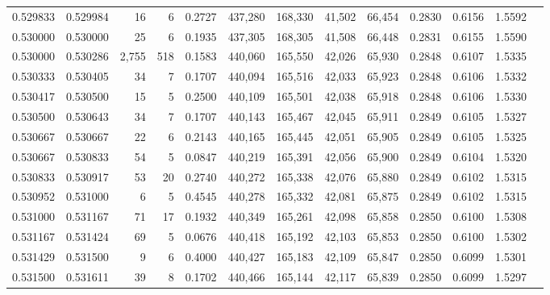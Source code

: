 \begin{tabular}{rrrrrrrrrrrrr}
0.529833 & 0.529984 &    16 &   6 &                                     0.2727 & 437,280 & 168,330 &  41,502 &  66,454 & 0.2830 & 0.6156 & 1.5592 \\
0.530000 & 0.530000 &    25 &   6 &                                     0.1935 & 437,305 & 168,305 &  41,508 &  66,448 & 0.2831 & 0.6155 & 1.5590 \\
0.530000 & 0.530286 & 2,755 & 518 &                                     0.1583 & 440,060 & 165,550 &  42,026 &  65,930 & 0.2848 & 0.6107 & 1.5335 \\
0.530333 & 0.530405 &    34 &   7 &                                     0.1707 & 440,094 & 165,516 &  42,033 &  65,923 & 0.2848 & 0.6106 & 1.5332 \\
0.530417 & 0.530500 &    15 &   5 &                                     0.2500 & 440,109 & 165,501 &  42,038 &  65,918 & 0.2848 & 0.6106 & 1.5330 \\
0.530500 & 0.530643 &    34 &   7 &                                     0.1707 & 440,143 & 165,467 &  42,045 &  65,911 & 0.2849 & 0.6105 & 1.5327 \\
0.530667 & 0.530667 &    22 &   6 &                                     0.2143 & 440,165 & 165,445 &  42,051 &  65,905 & 0.2849 & 0.6105 & 1.5325 \\
0.530667 & 0.530833 &    54 &   5 &                                     0.0847 & 440,219 & 165,391 &  42,056 &  65,900 & 0.2849 & 0.6104 & 1.5320 \\
0.530833 & 0.530917 &    53 &  20 &                                     0.2740 & 440,272 & 165,338 &  42,076 &  65,880 & 0.2849 & 0.6102 & 1.5315 \\
0.530952 & 0.531000 &     6 &   5 &                                     0.4545 & 440,278 & 165,332 &  42,081 &  65,875 & 0.2849 & 0.6102 & 1.5315 \\
0.531000 & 0.531167 &    71 &  17 &                                     0.1932 & 440,349 & 165,261 &  42,098 &  65,858 & 0.2850 & 0.6100 & 1.5308 \\
0.531167 & 0.531424 &    69 &   5 &                                     0.0676 & 440,418 & 165,192 &  42,103 &  65,853 & 0.2850 & 0.6100 & 1.5302 \\
0.531429 & 0.531500 &     9 &   6 &                                     0.4000 & 440,427 & 165,183 &  42,109 &  65,847 & 0.2850 & 0.6099 & 1.5301 \\
0.531500 & 0.531611 &    39 &   8 &                                     0.1702 & 440,466 & 165,144 &  42,117 &  65,839 & 0.2850 & 0.6099 & 1.5297 \\

\end{tabular}
